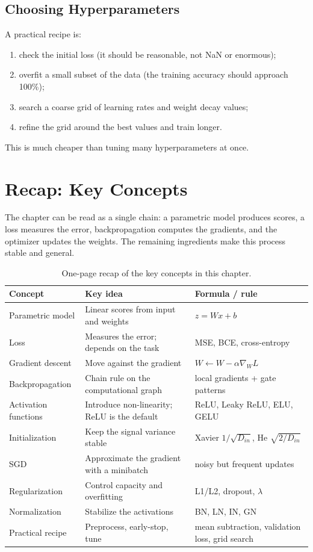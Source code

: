\subsection{Choosing Hyperparameters}
A practical recipe is:
\begin{enumerate}[leftmargin=*]
    \item check the initial loss (it should be reasonable, not NaN or enormous);
    \item overfit a small subset of the data (the training accuracy should approach 100\%);
    \item search a coarse grid of learning rates and weight decay values;
    \item refine the grid around the best values and train longer.
\end{enumerate}
This is much cheaper than tuning many hyperparameters at once.

\newpage
\section{Recap: Key Concepts}

The chapter can be read as a single chain: a parametric model produces scores, a loss measures the error, backpropagation computes the gradients, and the optimizer updates the weights. The remaining ingredients make this process stable and general.

\begin{table}[htbp]
\centering
\small
\renewcommand{\arraystretch}{1.2}
\begin{tabular}{p{} p{} p{}}
\toprule
\textbf{Concept} & \textbf{Key idea} & \textbf{Formula / rule} \\
\midrule
Parametric model & Linear scores from input and weights & $z = Wx+b$ \\
Loss & Measures the error; depends on the task & MSE, BCE, cross-entropy \\
Gradient descent & Move against the gradient & $W \leftarrow W - \alpha \nabla_W L$ \\
Backpropagation & Chain rule on the computational graph & local gradients + gate patterns \\
Activation functions & Introduce non-linearity; ReLU is the default & ReLU, Leaky ReLU, ELU, GELU \\
Initialization & Keep the signal variance stable & Xavier $1/\sqrt{D_{in}}$, He $\sqrt{2/D_{in}}$ \\
SGD & Approximate the gradient with a minibatch & noisy but frequent updates \\
Regularization & Control capacity and overfitting & L1/L2, dropout, $\lambda$ \\
Normalization & Stabilize the activations & BN, LN, IN, GN \\
Practical recipe & Preprocess, early-stop, tune & mean subtraction, validation loss, grid search \\
\bottomrule
\end{tabular}
\caption{One-page recap of the key concepts in this chapter.}\label{tab:ch1_recap}
\end{table}

